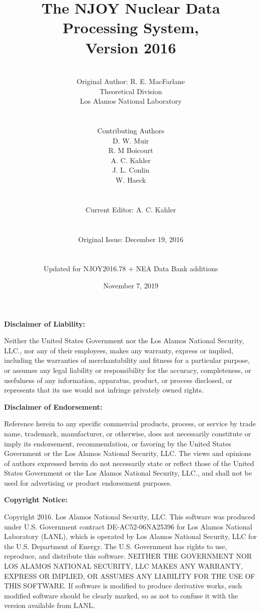 \documentclass[11pt,twoside]{NJOYMan}
\title{\bf The NJOY Nuclear Data Processing System,\\Version 2016}
\author{\\
  Original Author:  R. E. MacFarlane\\
  Theoretical Division\\
  Los Alamos National Laboratory\\
\\
\\
Contributing Authors\\
D. W. Muir\\
R. M Boicourt\\
A. C. Kahler\\
J. L. Conlin\\
W. Haeck\\
\\
\\
Current Editor:  A. C. Kahler\\
\\
\\
Original Issue:  December 19, 2016\\
\\
\\
Updated for NJOY2016.78 $+$ NEA Data Bank additions
\\}
\date{November 7, 2019}
\renewcommand{\headrulewidth}{0pt}     %
\renewcommand{\footrulewidth}{0pt}}    %
\begin{document}
\maketitle
{}

\clearpage
\fancyhf{}                           %
%
\renewcommand{\headrulewidth}{0pt}   %
\renewcommand{\footrulewidth}{0pt}   %

%
\begin{center} \textbf{Disclaimer of Liability:} \end{center}
Neither the United States Government nor the Los Alamos
National Security, LLC., nor any of their employees, makes any warranty,
express or implied, including the warranties of merchantability and
fitness for a particular purpose, or assumes any legal liability or
responsibility for the accuracy, completeness, or usefulness of any
information, apparatus, product, or process disclosed, or represents
that its use would not infringe privately owned rights.

\vspace{0.25in}
\begin{center} \textbf{Disclaimer of Endorsement:} \end{center}
Reference herein to any specific commercial products,
process, or service by trade name, trademark, manufacturer, or otherwise,
does not necessarily constitute or imply its endorsement, recommendation,
or favoring by the United States Government or the Los Alamos National
Security, LLC. The views and opinions of authors expressed herein do not
necessarily state or reflect those of the United States Government or
the Los Alamos National Security, LLC., and shall not be used for
advertising or product endorsement purposes.

\vspace{0.25in}
\begin{center} \textbf{Copyright Notice:} \end{center}
Copyright 2016. Los Alamos National Security, LLC. This software was
produced under U.S. Government contract DE-AC52-06NA25396 for
Los Alamos National Laboratory (LANL), which is operated by
Los Alamos National Security, LLC for the U.S. Department of
Energy. The U.S. Government has rights to use, reproduce, and
distribute this software.  NEITHER THE GOVERNMENT NOR LOS ALAMOS
NATIONAL SECURITY, LLC MAKES ANY WARRANTY, EXPRESS OR IMPLIED, OR
ASSUMES ANY LIABILITY FOR THE USE OF THIS SOFTWARE.  If software
is modified to produce derivative works, such modified software
should be clearly marked, so as not to confuse it with the version
available from LANL.
\end{document}
